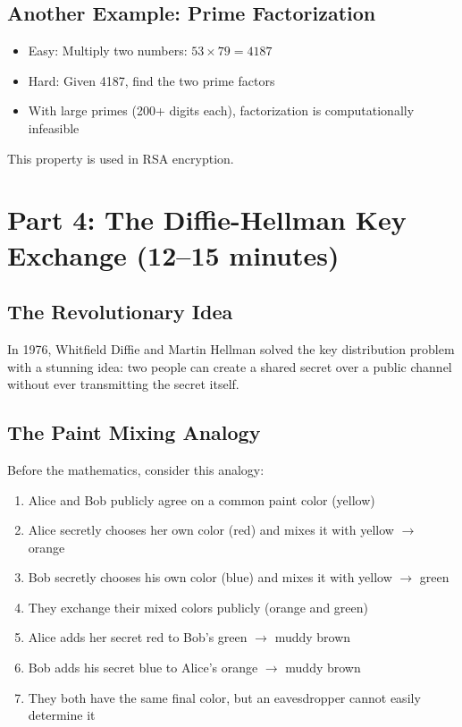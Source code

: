 \documentclass[11pt]{article}
\begin{document}
\subsection*{Another Example: Prime Factorization}
\begin{itemize}
    \item Easy: Multiply two numbers: $53 \times 79 = 4187$
    \item Hard: Given 4187, find the two prime factors
    \item With large primes (200+ digits each), factorization is computationally infeasible
\end{itemize}

This property is used in RSA encryption.

\section{Part 4: The Diffie-Hellman Key Exchange (12--15 minutes)}

\subsection*{The Revolutionary Idea}
In 1976, Whitfield Diffie and Martin Hellman solved the key distribution problem with a stunning idea: two people can create a shared secret over a public channel without ever transmitting the secret itself.

\subsection*{The Paint Mixing Analogy}
Before the mathematics, consider this analogy:

\begin{enumerate}
    \item Alice and Bob publicly agree on a common paint color (yellow)
    \item Alice secretly chooses her own color (red) and mixes it with yellow $\rightarrow$ orange
    \item Bob secretly chooses his own color (blue) and mixes it with yellow $\rightarrow$ green
    \item They exchange their mixed colors publicly (orange and green)
    \item Alice adds her secret red to Bob's green $\rightarrow$ muddy brown
    \item Bob adds his secret blue to Alice's orange $\rightarrow$ muddy brown
    \item They both have the same final color, but an eavesdropper cannot easily determine it
\end{enumerate}
\end{document}
